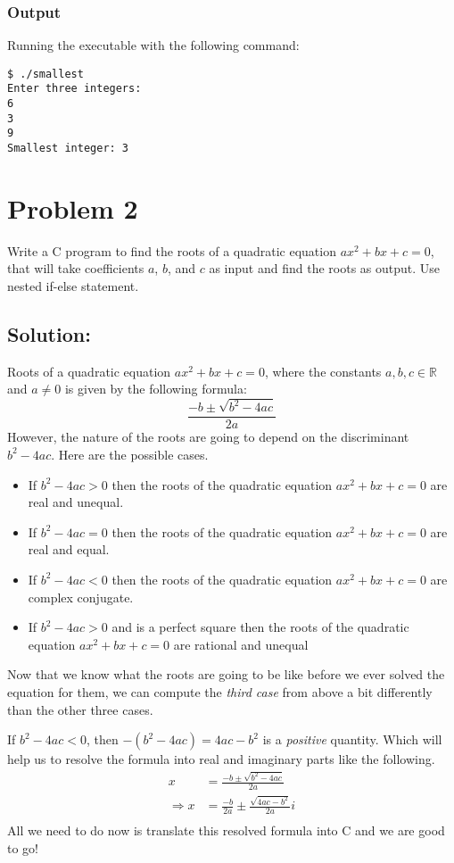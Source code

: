 \documentclass[12pt, letterpaper]{report}
\begin{document}
\subsubsection*{Output}
Running the executable with the following command:
\begin{verbatim}
$ ./smallest
Enter three integers:
6
3
9
Smallest integer: 3
\end{verbatim}

\section*{Problem 2}
{\large Write a C program to find the roots of a quadratic equation $ax^2 + bx + c = 0$, that will take coefficients $a$, $b$, and $c$ as input and find the roots as output. Use nested if-else statement.}

\subsection*{Solution:}
Roots of a quadratic equation $ax^2 + bx + c = 0$, where the constants $a, b, c\in\mathbb{R}$ and $a \ne 0$ is given by the
following formula:
\begin{displaymath}
\frac{-b\pm\sqrt{b^2-4ac}}{2a}
\end{displaymath}
However, the nature of the roots are going to depend on the discriminant $b^2-4ac$. Here are the possible cases.
\begin{itemize}
    \item{If $b^2-4ac > 0$ then the roots of the quadratic equation $ax^2 +bx+ c = 0$ are real and unequal.}
    \item{If $b^2-4ac = 0$ then the roots of the quadratic equation $ax^2 +bx+ c = 0$ are real and equal.}
    \item{If $b^2-4ac < 0$ then the roots of the quadratic equation $ax^2 +bx+ c = 0$ are complex conjugate.}
    \item{If $b^2-4ac > 0$ and is a perfect square then the roots of the quadratic equation $ax^2 +bx+ c = 0$ are rational and unequal}
\end{itemize}
Now that we know what the roots are going to be like before we ever solved the equation for them, we can compute the \emph{third case} from above a bit differently than the other three cases.

If $b^2 - 4ac < 0$, then $-(b^2 - 4ac) = 4ac - b^2$ is a \emph{positive} quantity. Which will help us to resolve the formula into real and imaginary
parts like the following.
\begin{align*}
x &= \frac{-b\pm\sqrt{b^2-4ac}}{2a}\\
\Rightarrow x &= \frac{-b}{2a} \pm \frac{\sqrt{4ac - b^2}}{2a}i\\
\end{align*}
All we need to do now is translate this resolved formula into C and we are good to go!
\end{document}
